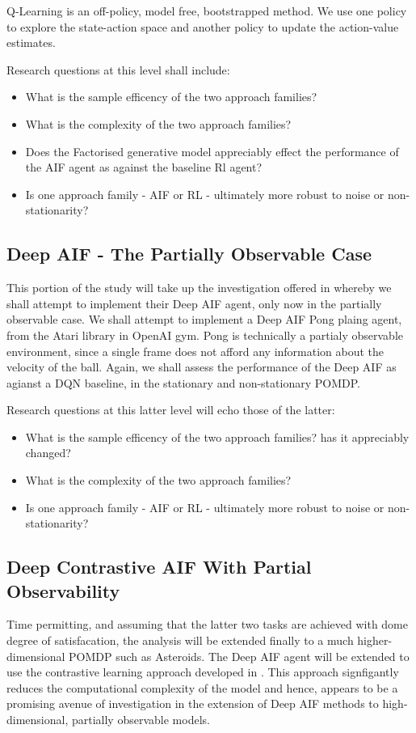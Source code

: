 \documentclass[12pt, twoside]{report}
\begin{document}
Q-Learning is an off-policy, model free, bootstrapped method. We use one policy to explore the state-action space and another policy to update the action-value estimates.

Research questions at this level shall include:
\begin{itemize}
\item What is the sample efficency of the two approach families?
\item What is the complexity of the two approach families?
\item Does the Factorised generative model appreciably effect the performance of the AIF agent as against the baseline Rl agent?
\item Is one approach family - AIF or RL - ultimately more robust to noise or non-stationarity?
\end{itemize}  
   
\subsection{Deep AIF - The Partially Observable Case}
This portion of the study will take up the investigation offered in \textcite{Scaling-AIF} whereby we shall attempt to implement their Deep AIF agent, only now in the partially observable case. 
We shall attempt to implement a Deep AIF Pong plaing agent, from the Atari library in OpenAI gym. Pong is technically a partialy observable environment, since a single frame does not afford any information about the velocity of the ball. Again, we shall assess the performance of the Deep AIF as agianst a DQN baseline, in the stationary and non-stationary POMDP.  

Research questions at this latter level will echo those of the latter:
\begin{itemize}
\item What is the sample efficency of the two approach families? has it appreciably changed?
\item What is the complexity of the two approach families?
\item Is one approach family - AIF or RL - ultimately more robust to noise or non-stationarity?
\end{itemize}
  
\subsection{Deep Contrastive AIF With Partial Observability}
Time permitting, and assuming that the latter two tasks are achieved with dome degree of satisfacation, the analysis will be extended finally to a much higher-dimensional POMDP such as Asteroids. The Deep AIF agent will be extended to use the contrastive learning approach developed in \textcite{Contrastive-AIF}. This approach signfigantly reduces the computational complexity of the model and hence, appears to be a promising avenue of investigation in the extension of Deep AIF methods to high-dimensional, partially observable models.   
\end{document}
